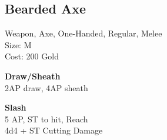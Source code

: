 \subsection{Bearded Axe}\label{weapon:beardedAxe}
Weapon, Axe, One-Handed, Regular, Melee\\
Size: M\\
Cost: 200 Gold

\textbf{Draw/Sheath}\\
2AP draw, 4AP sheath

\textbf{Slash}\\
5 AP, ST to hit,  Reach\\
4d4 + \texttimes ST Cutting Damage
